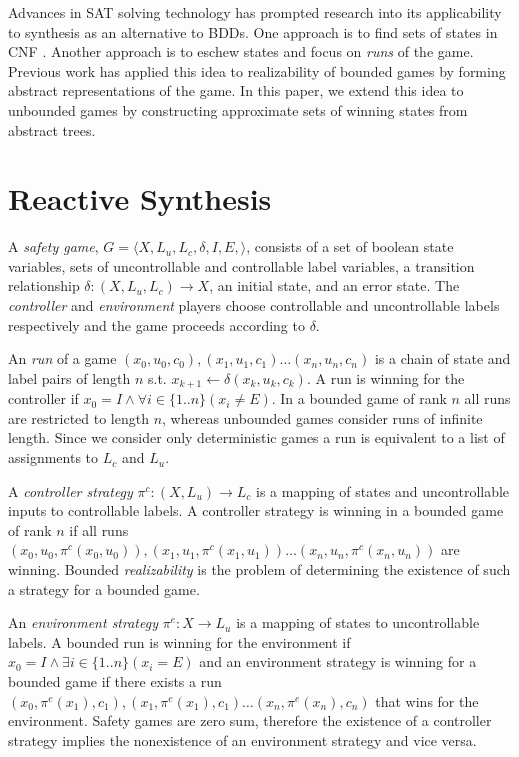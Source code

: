 \documentclass{llncs}
\begin{document}
Advances in SAT solving technology has prompted research into its applicability
to synthesis as an alternative to BDDs. One approach is to find sets of states
in CNF \cite{demiurge}. Another approach is to eschew states and focus on
\emph{runs} of the game. Previous work has applied this idea to realizability
of bounded games \cite{narodytska2014} by forming abstract representations of
the game.  In this paper, we extend this idea to unbounded games by
constructing approximate sets of winning states from abstract trees.

\section{Reactive Synthesis}

A \emph{safety game}, $G = \langle X, L_u, L_c, \delta, I, E, \rangle$,
consists of a set of boolean state variables, sets of uncontrollable and
controllable label variables, a transition relationship $\delta : (X, L_u, L_c)
\to X$, an initial state, and an error state. The \emph{controller} and
\emph{environment} players choose controllable and uncontrollable labels
respectively and the game proceeds according to $\delta$. 

An \emph{run} of a game $(x_0, u_0, c_0), (x_1, u_1, c_1) \dots (x_n, u_n,
c_n)$ is a chain of state and label pairs of length $n$ s.t.  $x_{k+1}
\leftarrow \delta(x_k, u_k, c_k)$. A run is winning for the controller if $x_0
= I \land \forall i \in \{1..n\} (x_i \neq E)$. In a bounded game of rank $n$
all runs are restricted to length $n$, whereas unbounded games consider runs of
infinite length. Since we consider only deterministic games a run is equivalent
to a list of assignments to $L_c$ and $L_u$.

A \emph{controller strategy} $\pi^c : (X, L_u) \to L_c$ is a mapping of states
and uncontrollable inputs to controllable labels. A controller strategy is
winning in a bounded game of rank $n$ if all runs $(x_0, u_0, \pi^c(x_0, u_0)),
(x_1, u_1, \pi^c(x_1, u_1)) \dots (x_n, u_n, \pi^c(x_n, u_n))$ are winning.
Bounded \emph{realizability} is the problem of determining the existence of
such a strategy for a bounded game.

An \emph{environment strategy} $\pi^e : X \to L_u$ is a mapping of states to
uncontrollable labels. A bounded run is winning for the environment if $x_0
= I \land \exists i \in \{1..n\} (x_i = E)$ and an environment strategy is
winning for a bounded game if there exists a run $(x_0, \pi^e(x_1), c_1), (x_1,
\pi^e(x_1), c_1) \dots (x_n, \pi^e(x_n), c_n)$ that wins for the environment.
Safety games are zero sum, therefore the existence of a controller strategy
implies the nonexistence of an environment strategy and vice versa.
\end{document}
